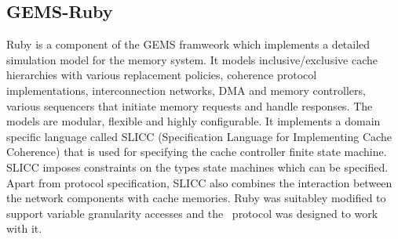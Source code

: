 \subsection{GEMS-Ruby}

Ruby is a component of the GEMS framweork which implements a detailed simulation model for the memory system.  It models inclusive/exclusive cache hierarchies with various replacement policies, coherence protocol implementations, interconnection networks, DMA and memory controllers, various sequencers that initiate memory requests and handle responses. The models are modular, flexible and highly configurable. It implements a domain specific language called SLICC (Specification Language for Implementing Cache Coherence) that is used for specifying the cache controller finite state machine. SLICC imposes constraints on the types state machines which can be specified. Apart from protocol specification, SLICC also combines the interaction between the network components with cache memories. Ruby was suitabley modified to support variable granularity accesses and the \AC\ protocol was designed to work with it. 



